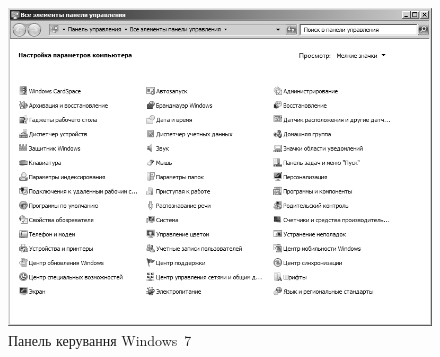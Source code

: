\documentclass[
	a4paper,
	oneside,
	DIV = 12,
	12pt,
	headings = normal,
]{scrartcl}
\begin{document}
			\begin{figure}[!htbp]
				\centering
				\includegraphics[height = 12\baselineskip]{./assets/y03s01-syssoft-lab-01-scr-01-controlpanel-bw.png}
				\caption{Панель керування Windows~7}
				\label{fig:01-win7-control-panel}
			\end{figure}
			
\end{document}
